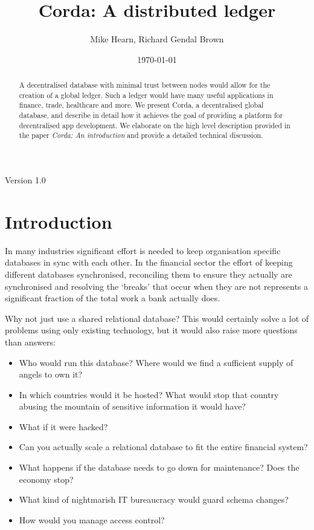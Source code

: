 \documentclass{article}
\author{Mike Hearn, Richard Gendal Brown}
\date{\today}
\title{Corda: A distributed ledger}
\begin{document}
\maketitle
\begin{center}
Version 1.0
\end{center}

\vspace{10mm}

\begin{abstract}

A decentralised database with minimal trust between nodes would allow for the creation of a global ledger. Such a ledger
would have many useful applications in finance, trade, healthcare and more. We present Corda, a decentralised
global database, and describe in detail how it achieves the goal of providing a platform for decentralised app
development. We elaborate on the high level description provided in the paper \emph{Corda: An
introduction}\cite{CordaIntro} and provide a detailed technical discussion.

\end{abstract}
\vfill

\newpage
\tableofcontents
\newpage
\section{Introduction}

In many industries significant effort is needed to keep organisation specific databases in sync with each other. In
the financial sector the effort of keeping different databases synchronised, reconciling them to ensure they
actually are synchronised and resolving the `breaks' that occur when they are not represents a significant fraction
of the total work a bank actually does.

Why not just use a shared relational database? This would certainly solve a lot of problems using only existing
technology, but it would also raise more questions than answers:

\begin{itemize}
\item Who would run this database? Where would we find a sufficient supply of angels to own it?
\item In which countries would it be hosted? What would stop that country abusing the mountain of sensitive information it would have?
\item What if it were hacked?
\item Can you actually scale a relational database to fit the entire financial system?
\item What happens if the database needs to go down for maintenance? Does the economy stop?
\item What kind of nightmarish IT bureaucracy would guard schema changes?
\item How would you manage access control?
\end{itemize}
\end{document}
